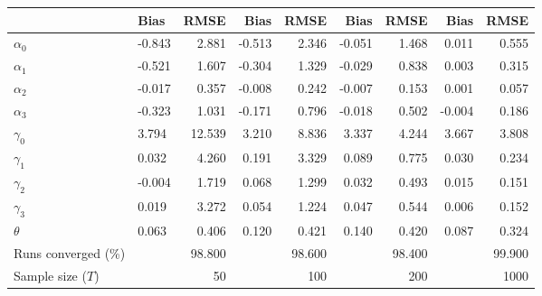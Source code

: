 
\begin{tabular}[t]{llrrrrrrr}
\toprule
  & Bias & RMSE & Bias & RMSE & Bias & RMSE & Bias & RMSE\\
\midrule
$\alpha_{0}$ & -0.843 & 2.881 & -0.513 & 2.346 & -0.051 & 1.468 & 0.011 & 0.555\\
$\alpha_{1}$ & -0.521 & 1.607 & -0.304 & 1.329 & -0.029 & 0.838 & 0.003 & 0.315\\
$\alpha_{2}$ & -0.017 & 0.357 & -0.008 & 0.242 & -0.007 & 0.153 & 0.001 & 0.057\\
$\alpha_{3}$ & -0.323 & 1.031 & -0.171 & 0.796 & -0.018 & 0.502 & -0.004 & 0.186\\
$\gamma_{0}$ & 3.794 & 12.539 & 3.210 & 8.836 & 3.337 & 4.244 & 3.667 & 3.808\\
$\gamma_{1}$ & 0.032 & 4.260 & 0.191 & 3.329 & 0.089 & 0.775 & 0.030 & 0.234\\
$\gamma_{2}$ & -0.004 & 1.719 & 0.068 & 1.299 & 0.032 & 0.493 & 0.015 & 0.151\\
$\gamma_{3}$ & 0.019 & 3.272 & 0.054 & 1.224 & 0.047 & 0.544 & 0.006 & 0.152\\
$\theta$ & 0.063 & 0.406 & 0.120 & 0.421 & 0.140 & 0.420 & 0.087 & 0.324\\
Runs converged (\%) &  & 98.800 &  & 98.600 &  & 98.400 &  & 99.900\\
Sample size ($T$) &  & 50 &  & 100 &  & 200 &  & 1000\\
\bottomrule
\end{tabular}
